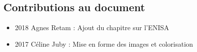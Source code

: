 \subsection{Contributions au document}
\begin{itemize}
\item 2018 Agnes Retam : Ajout du chapitre sur l’ENISA
\item 2017 Céline Juby : Mise en forme des images et colorisation
\end{itemize}

